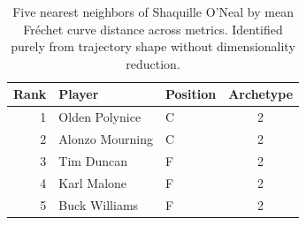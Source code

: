 \begin{table}[htbp]
  \centering\small
  \begin{tabular}{rllc}
    \toprule
    Rank & Player & Position & Archetype \\
    \midrule
    1 & Olden Polynice & C & 2 \\
    2 & Alonzo Mourning & C & 2 \\
    3 & Tim Duncan & F & 2 \\
    4 & Karl Malone & F & 2 \\
    5 & Buck Williams & F & 2 \\
    \bottomrule
  \end{tabular}
  \caption{Five nearest neighbors of Shaquille O'Neal by mean Fr\'{e}chet curve distance across metrics. Identified purely from trajectory shape without dimensionality reduction.}
  \label{tab:Shaquille_O_Neal_frechet_curve_neighbors}
\end{table}

